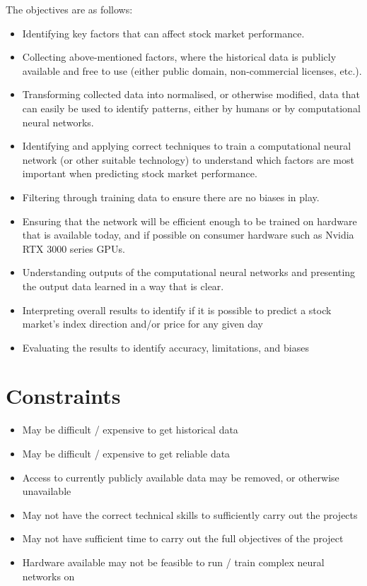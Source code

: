 The objectives are as follows:
\begin{itemize}
    \item Identifying key factors that can affect stock market performance.
    \item Collecting above-mentioned factors, where the historical data is publicly available and free to use (either public domain, non-commercial licenses, etc.).
    \item Transforming collected data into normalised, or otherwise modified, data that can easily be used to identify patterns, either by humans or by computational neural networks.
    \item Identifying and applying correct techniques to train a computational neural network (or other suitable technology) to understand which factors are most important when predicting stock market performance.
    \item Filtering through training data to ensure there are no biases in play.
    \item Ensuring that the network will be efficient enough to be trained on hardware that is available today, and if possible on consumer hardware such as Nvidia RTX 3000 series GPUs.
    \item Understanding outputs of the computational neural networks and presenting the output data learned in a way that is clear.
    \item Interpreting overall results to identify if it is possible to predict a stock market's index direction and/or price for any given day
    \item Evaluating the results to identify accuracy, limitations, and biases
\end{itemize}

\section{Constraints}
\begin{itemize}
    \item May be difficult / expensive to get historical data
    \item May be difficult / expensive to get reliable data
    \item Access to currently publicly available data may be removed, or otherwise unavailable
    \item May not have the correct technical skills to sufficiently carry out the projects
    \item May not have sufficient time to carry out the full objectives of the project
    \item Hardware available may not be feasible to run / train complex neural networks on
\end{itemize}


